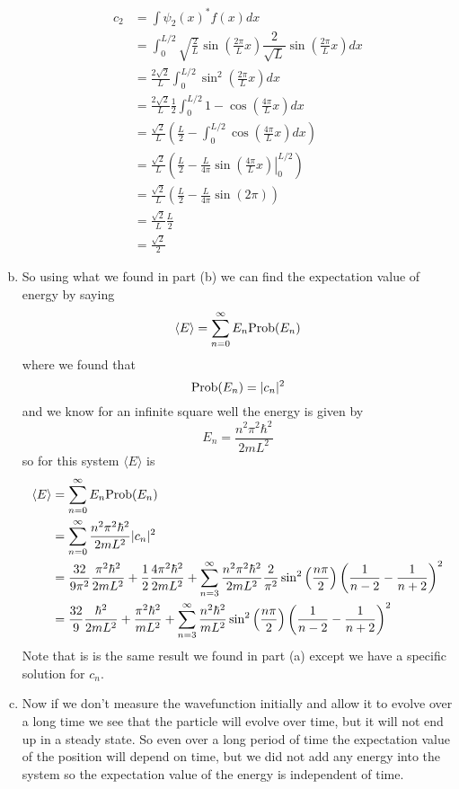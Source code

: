 \documentclass[11pt]{article}
\numberwithin{equation}{section}
\newcommand{\expt}[1]{\langle{#1}\rangle}
\begin{document}
\begin{enumerate}[(a)]
\begin{align*}
c_2 &= \int\psi_2(x)^*f(x)dx\\
&= \int_{0}^{L/2}\sqrt{\frac{2}{L}}\sin\left(\frac{2\pi}{L}x\right)\dfrac{2}{\sqrt{L}}\sin\left(\frac{2\pi}{L}x\right)dx\\
&= \frac{2\sqrt{2}}{L}\int_{0}^{L/2}\sin^2\left(\frac{2\pi}{L}x\right)dx\\
&= \frac{2\sqrt{2}}{L}\frac{1}{2}\int_{0}^{L/2}1-\cos\left(\frac{4\pi}{L}x\right)dx\\
&= \frac{\sqrt{2}}{L}\left(\frac{L}{2}- \int_{0}^{L/2}\cos\left(\frac{4\pi}{L}x\right)dx\right)\\
&= \frac{\sqrt{2}}{L}\left(\frac{L}{2}- \left.\frac{L}{4\pi}\sin\left(\frac{4\pi}{L}x\right)\right|_{0}^{L/2}\right)\\
&= \frac{\sqrt{2}}{L}\left(\frac{L}{2}- \frac{L}{4\pi}\sin\left(2\pi\right)\right)\\
&= \frac{\sqrt{2}}{L}\frac{L}{2}\\
&= \frac{\sqrt{2}}{2}
\end{align*}

\item
So using what we found in part (b) we can find the expectation value of energy by saying
$$\expt{E} = \sum_{n=0}^{\infty}E_n\textnormal{Prob}(E_n)$$
where we found that
$$\textnormal{Prob}(E_n) = |c_n|^2$$
and we know for an infinite square well the energy is given by
$$E_n = \frac{n^2\pi^2\hbar^2}{2mL^2}$$
so for this system $\expt{E}$ is
\begin{align*}
\expt{E} &= \sum_{n=0}^{\infty}E_n\textnormal{Prob}(E_n)\\
&= \sum_{n=0}^{\infty}\frac{n^2\pi^2\hbar^2}{2mL^2}|c_n|^2\\
&= \frac{32}{9\pi^2}\frac{\pi^2\hbar^2}{2mL^2}+ \frac{1}{2}\frac{4\pi^2\hbar^2}{2mL^2}+\sum_{n=3}^{\infty}\frac{n^2\pi^2\hbar^2}{2mL^2}\frac{2}{\pi^2}\sin^2\left(\frac{n\pi}{2}\right)\left(\frac{1}{n-2}-\frac{1}{n+2}\right)^2\\
&= \frac{32}{9}\frac{\hbar^2}{2mL^2}+ \frac{\pi^2\hbar^2}{mL^2}+\sum_{n=3}^{\infty}\frac{n^2\hbar^2}{mL^2}\sin^2\left(\frac{n\pi}{2}\right)\left(\frac{1}{n-2}-\frac{1}{n+2}\right)^2
\end{align*}
Note that is is the same result we found in part (a) except we have a specific solution for $c_n$.

\item
Now if we don't measure the wavefunction initially and allow it to evolve over a long time we see that the particle will evolve over time, but it will not end up in a steady state. So even over a long period of time the expectation value of the position will depend on time, but we did not add any energy into the system so the expectation value of the energy is independent of time.

\end{enumerate}
\end{document}
